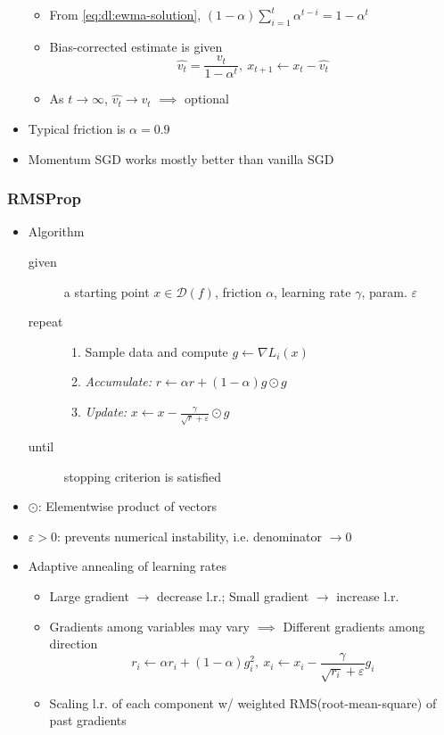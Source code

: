 \begin{itemize}
\begin{itemize}
        \item From \ref{eq:dl:ewma-solution}, $(1-\alpha)\sum_{i=1}^t\alpha^{t-i}=1-\alpha^t$
        \item Bias-corrected estimate is given
        \begin{equation}
            \hat{v_t}=\frac{v_t}{1-\alpha^t},~x_{t+1}\leftarrow x_t-\hat{v_t}
        \end{equation}
        \item As $t\to\infty$, $\hat{v_t}\to v_t$ $\implies$ optional
    \end{itemize}
    \item Typical friction is $\alpha=0.9$
    \item Momentum SGD works mostly better than vanilla SGD
\end{itemize}

\subsubsection*{RMSProp}
\begin{itemize}
    \item Algorithm
    \begin{description}
        \item[given] a starting point $x\in\mathcal{D}(f)$, friction $\alpha$, learning rate $\gamma$, param. $\varepsilon$
        \item[repeat] \phantom{}
        \begin{enumerate}
            \item Sample data and compute $g\leftarrow\nabla L_i(x)$
            \item \textit{Accumulate:} $r\leftarrow\alpha r+(1-\alpha)g\odot g$
            \item \textit{Update:} $x\leftarrow x-\frac{\gamma}{\sqrt{r}+\varepsilon}\odot g$
        \end{enumerate}
        \item[until] stopping criterion is satisfied
    \end{description}
    \item $\odot$: Elementwise product of vectors
    \item $\varepsilon>0$: prevents numerical instability, i.e. denominator $\to 0$
    \item Adaptive annealing of learning rates
    \begin{itemize}
        \item Large gradient $\to$ decrease l.r.; Small gradient $\to$ increase l.r.
        \item Gradients among variables may vary $\implies$ Different gradients among direction
        \begin{equation}
            r_i\leftarrow\alpha r_i+(1-\alpha)g_i^2,~x_i\leftarrow x_i-\frac{\gamma}{\sqrt{r_i}+\varepsilon}g_i
        \end{equation}
        \item Scaling l.r. of each component w/ weighted RMS(root-mean-square) of past gradients
    \end{itemize}
\end{itemize}

